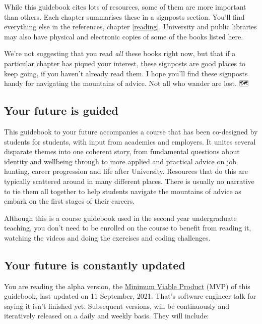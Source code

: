 \documentclass[
]{book}
\begin{document}
While this guidebook cites lots of resources, some of them are more important than others. Each chapter summarises these in a signposts section. You'll find everything else in the references, chapter \ref{reading}. University and public libraries may also have physical and electronic copies of some of the books listed here.

We're not suggesting that you read \emph{all} these books right now, but that if a particular chapter has piqued your interest, these signposts are good places to keep going, if you haven't already read them. I hope you'll find these signposts handy for navigating the mountains of advice. Not all who wander are lost. 🗺️🧭

\hypertarget{study}{%
\subsection{Your future is guided}\label{study}}

This guidebook to your future accompanies a course that has been co-designed by students for students, with input from academics and employers. It unites several disparate themes into one coherent story, from fundamental questions about identity and wellbeing through to more applied and practical advice on job hunting, career progression and life after University. Resources that do this are typically scattered around in many different places. There is usually no narrative to tie them all together to help students navigate the mountains of advice as embark on the first stages of their careers.

Although this is a course guidebook used in the second year undergraduate teaching, you don't need to be enrolled on the course to benefit from reading it, watching the videos and doing the exercises and coding challenges.

\hypertarget{version}{%
\subsection{Your future is constantly updated}\label{version}}

You are reading the alpha version, the \href{https://en.wikipedia.org/wiki/Minimum_viable_product}{Minimum Viable Product} (MVP) of this guidebook, last updated on 11 September, 2021. That's software engineer talk for saying it isn't finished yet. Subsequent versions, will be continuously and iteratively released on a daily and weekly basis. They will include:
\end{document}
